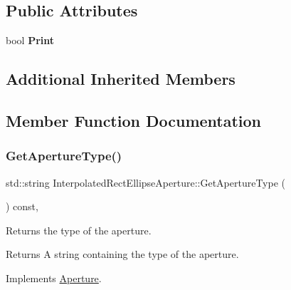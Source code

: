 \subsection*{Public Attributes}
\begin{DoxyCompactItemize}
\item 
\mbox{\label{classInterpolatedRectEllipseAperture_acf0dbeca73324999d2130270f893c3f1}} 
bool {\bfseries Print}
\end{DoxyCompactItemize}
\subsection*{Additional Inherited Members}


\subsection{Member Function Documentation}
\mbox{\label{classInterpolatedRectEllipseAperture_a310886ba54e5ea6a4e95d8946c9a7440}} 
\subsubsection{\texorpdfstring{Get\+Aperture\+Type()}{GetApertureType()}}
{\footnotesize\ttfamily std\+::string Interpolated\+Rect\+Ellipse\+Aperture\+::\+Get\+Aperture\+Type (\begin{DoxyParamCaption}{ }\end{DoxyParamCaption}) const\hspace{0.3cm}{\ttfamily [inline]}, {\ttfamily [virtual]}}

Returns the type of the aperture. \begin{DoxyReturn}{Returns}
A string containing the type of the aperture. 
\end{DoxyReturn}


Implements \hyperlink{classAperture_ad7af612271a0586feea83c38549dfb75}{Aperture}.

\mbox{\label{classInterpolatedRectEllipseAperture_aac0970213673334851109d69e0e6a423}} 
